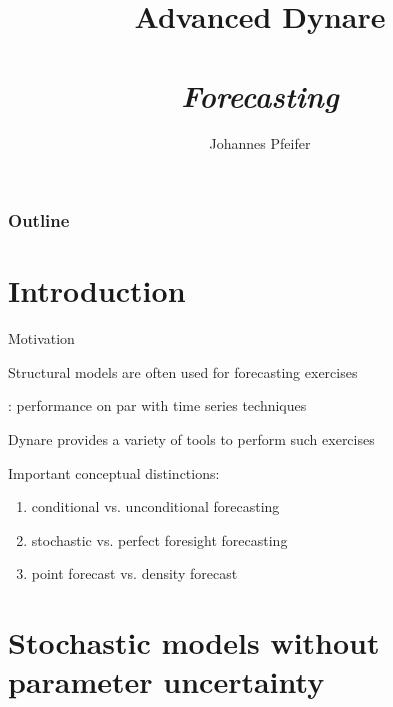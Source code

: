 \documentclass[handout,usepdftitle=false,xcolor=dvipsnames,aspectratio=169]{beamer}
\begin{document}


\title[]{\textbf{Advanced Dynare\\}
  \\
  \emph{Forecasting}
}

\author{Johannes Pfeifer}




\maketitle
%
\begin{frame}
  \frametitle{Outline}
  \tableofcontents%
\end{frame}



\section{Introduction}

\begin{frame}{Motivation}
  \begin{witemize}
    \item Structural models are often used for forecasting exercises
    \item \textcite{SmetsWouters2007}: performance on par with time series techniques
    \item Dynare provides a variety of tools to perform such exercises
    \item Important conceptual distinctions:
    \begin{enumerate}
      \item conditional vs. unconditional forecasting
      \item stochastic vs. perfect foresight forecasting
      \item point forecast vs. density forecast
    \end{enumerate}
  \end{witemize}
\end{frame}



\section[Stochastics w/o parameter uncertainty]{Stochastic models without parameter uncertainty}
\end{document}
